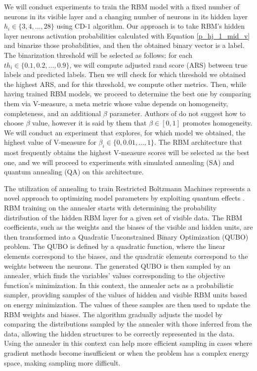 \documentclass[a4paper,12pt]{article}
\begin{document}
We will conduct experiments to train the RBM model with a fixed number of neurons in its visible layer and a changing number of neurons in its hidden layer $h_i \in \{3, 4, \ldots, 28\}$ using CD-$1$ algorithm. Our approach is to take RBM's hidden layer neurons activation probabilities calculated with Equation \eqref{p_hj_1_mid_v} and binarize those probabilities, and then the obtained binary vector is a label. The binarization threshold will be selected as follows: for each $th_i \in \{0.1, 0.2, \ldots, 0.9\}$, we will compute adjusted rand score (ARS) between true labels and predicted labels. Then we will check for which threshold we obtained the highest ARS, and for this threshold, we compute other metrics. Then, while having trained RBM models, we proceed to determine the best one by comparing them via V-measure, a meta metric whose value depends on homogeneity, completeness, and an additional $\beta$ parameter. Authors of \cite{Rosenberg2007} do not suggest how to choose $\beta$ value, however it is said by them that $\beta \in [0,1]$ promotes homogeneity. We will conduct an experiment that explores, for which model we obtained, the highest value of V-measure for $\beta_i \in \{0, 0.01, \ldots, 1\}$. The RBM architecture that most frequently obtains the highest V-measure scores will be selected as the best one, and we will proceed to experiments with simulated annealing (SA) and quantum annealing (QA) on this architecture.

The utilization of annealing to train Restricted Boltzmann Machines represents a novel approach to optimizing model parameters by exploiting quantum effects \cite{Datta2005, Dixit2021RBM_DWave}. RBM training on the annealer starts with determining the probability distribution of the hidden RBM layer for a given set of visible data. The RBM coefficients, such as the weights and the biases of the visible and hidden units, are then transformed into a Quadratic Unconstrained Binary Optimization (QUBO) problem. The QUBO is defined by a quadratic function, where the linear elements correspond to the biases, and the quadratic elements correspond to the weights between the neurons. The generated QUBO is then sampled by an annealer, which finds the variables' values corresponding to the objective function's minimization. In this context, the annealer acts as a probabilistic sampler, providing samples of the values of hidden and visible RBM units based on energy minimization. The values of these samples are then used to update the RBM weights and biases. The algorithm gradually adjusts the model by comparing the distributions sampled by the annealer with those inferred from the data, allowing the hidden structures to be correctly represented in the data. Using the annealer in this context can help more efficient sampling in cases where gradient methods become insufficient or when the problem has a complex energy space, making sampling more difficult.
\end{document}
